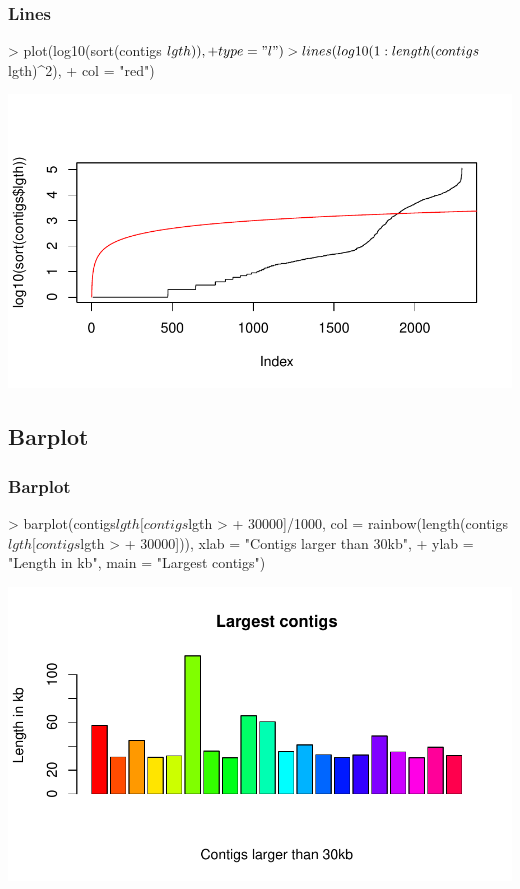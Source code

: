 \begin{frame}
  \frametitle{Lines}
  \scriptsize 
\begin{Schunk}
\begin{Sinput}
> plot(log10(sort(contigs$lgth)), 
+     type = "l")
> lines(log10(1:length(contigs$lgth)^2), 
+     col = "red")
\end{Sinput}
\end{Schunk}
\includegraphics{plots/fig-025}
\normalsize
\end{frame}

\subsection{Barplot}

\begin{frame}
  \frametitle{Barplot}
  \scriptsize 
\begin{Schunk}
\begin{Sinput}
> barplot(contigs$lgth[contigs$lgth > 
+     30000]/1000, col = rainbow(length(contigs$lgth[contigs$lgth > 
+     30000])), xlab = "Contigs larger than 30kb", 
+     ylab = "Length in kb", main = "Largest contigs")
\end{Sinput}
\end{Schunk}
\includegraphics{plots/fig-026}
\normalsize
\end{frame}


